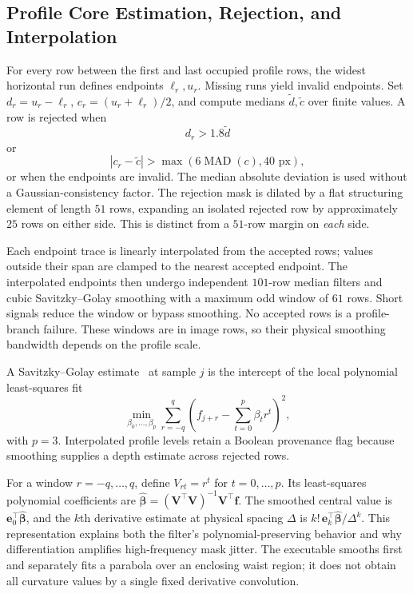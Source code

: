 \documentclass[11pt,a4paper]{article}
\numberwithin{equation}{section}
\begin{document}
\subsection{Profile Core Estimation, Rejection, and Interpolation}
For every row between the first and last occupied profile rows, the widest horizontal run defines endpoints $\ell_r,u_r$. Missing runs yield invalid endpoints. Set $d_r=u_r-\ell_r$, $c_r=(u_r+\ell_r)/2$, and compute medians $\widetilde d,\widetilde c$ over finite values. A row is rejected when
\begin{equation}
d_r>1.8\widetilde d
\label{eq:depth_rejection1}
\end{equation}
or
\begin{equation}
|c_r-\widetilde c|>\max(6\operatorname{MAD}(c),40\text{ px}),
\label{eq:depth_rejection2}
\end{equation}
or when the endpoints are invalid. The median absolute deviation is used without a Gaussian-consistency factor. The rejection mask is dilated by a flat structuring element of length $51$ rows, expanding an isolated rejected row by approximately $25$ rows on either side. This is distinct from a $51$-row margin on \emph{each} side.

Each endpoint trace is linearly interpolated from the accepted rows; values outside their span are clamped to the nearest accepted endpoint. The interpolated endpoints then undergo independent $101$-row median filters and cubic Savitzky--Golay smoothing with a maximum odd window of $61$ rows. Short signals reduce the window or bypass smoothing. No accepted rows is a profile-branch failure. These windows are in image rows, so their physical smoothing bandwidth depends on the profile scale.

A Savitzky--Golay estimate~\cite{savitzky1964smoothing} at sample $j$ is the intercept of the local polynomial least-squares fit
\begin{equation}
\min_{\beta_0,\ldots,\beta_p}\sum_{r=-q}^{q}\left(f_{j+r}-\sum_{t=0}^{p}\beta_t r^t\right)^2,
\label{eq:sg_fit}
\end{equation}
with $p=3$. Interpolated profile levels retain a Boolean provenance flag because smoothing supplies a depth estimate across rejected rows.

For a window $r=-q,\ldots,q$, define $V_{rt}=r^t$ for $t=0,\ldots,p$. Its least-squares polynomial coefficients are $\hat{\boldsymbol\beta}=(\mathbf V^\top\mathbf V)^{-1}\mathbf V^\top\mathbf f$. The smoothed central value is $\mathbf e_0^\top\hat{\boldsymbol\beta}$, and the $k$th derivative estimate at physical spacing $\Delta$ is $k!\,\mathbf e_k^\top\hat{\boldsymbol\beta}/\Delta^k$. This representation explains both the filter's polynomial-preserving behavior and why differentiation amplifies high-frequency mask jitter. The executable smooths first and separately fits a parabola over an enclosing waist region; it does not obtain all curvature values by a single fixed derivative convolution.
\end{document}
